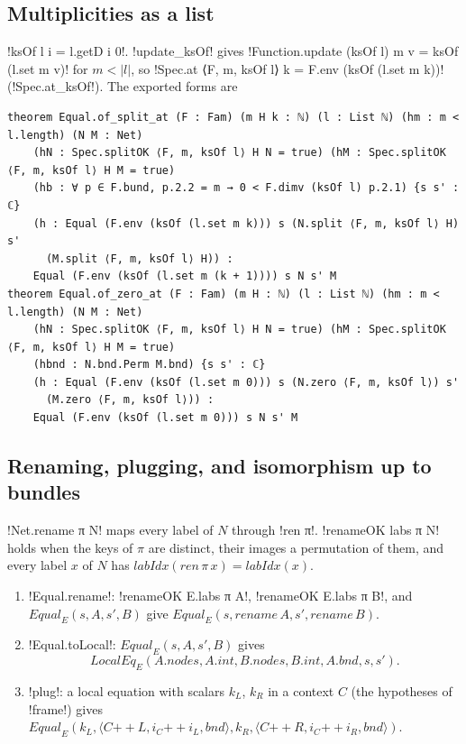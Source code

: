 {\subsection{Multiplicities as a list}
\lbx!ksOf l i = l.getD i 0!. \lbx!update_ksOf! gives \lbx!Function.update (ksOf l) m v = ksOf (l.set m v)! for $m<|l|$, so \lbx!Spec.at ⟨F, m, ksOf l⟩ k = F.env (ksOf (l.set m k))! (\lbx!Spec.at_ksOf!). The exported forms are
\begin{lstlisting}[style=leanbox]
theorem Equal.of_split_at (F : Fam) (m H k : ℕ) (l : List ℕ) (hm : m < l.length) (N M : Net)
    (hN : Spec.splitOK ⟨F, m, ksOf l⟩ H N = true) (hM : Spec.splitOK ⟨F, m, ksOf l⟩ H M = true)
    (hb : ∀ p ∈ F.bund, p.2.2 = m → 0 < F.dimv (ksOf l) p.2.1) {s s' : ℂ}
    (h : Equal (F.env (ksOf (l.set m k))) s (N.split ⟨F, m, ksOf l⟩ H) s'
      (M.split ⟨F, m, ksOf l⟩ H)) :
    Equal (F.env (ksOf (l.set m (k + 1)))) s N s' M
theorem Equal.of_zero_at (F : Fam) (m H : ℕ) (l : List ℕ) (hm : m < l.length) (N M : Net)
    (hN : Spec.splitOK ⟨F, m, ksOf l⟩ H N = true) (hM : Spec.splitOK ⟨F, m, ksOf l⟩ H M = true)
    (hbnd : N.bnd.Perm M.bnd) {s s' : ℂ}
    (h : Equal (F.env (ksOf (l.set m 0))) s (N.zero ⟨F, m, ksOf l⟩) s'
      (M.zero ⟨F, m, ksOf l⟩)) :
    Equal (F.env (ksOf (l.set m 0))) s N s' M
\end{lstlisting}

\subsection{Renaming, plugging, and isomorphism up to bundles}

\begin{definition}[Renaming]\label{def:boxes-rename}
\lbx!Net.rename π N! maps every label of $N$ through \lbx!ren π!. \lbx!renameOK labs π N! holds when the keys of $\pi$ are distinct, their images a permutation of them, and every label $x$ of $N$ has $\mathit{labIdx}(\mathit{ren}\,\pi\,x)=\mathit{labIdx}(x)$.
\end{definition}
\begin{proposition}\label{prop:boxes-rename-plug}
\begin{enumerate}
\item \lbx!Equal.rename!: \lbx!renameOK E.labs π A!, \lbx!renameOK E.labs π B!, and $\mathit{Equal}_E(s,A,s',B)$ give $\mathit{Equal}_E(s,\mathit{rename}\,A,s',\mathit{rename}\,B)$.
\item \lbx!Equal.toLocal!: $\mathit{Equal}_E(s,A,s',B)$ gives
\[\mathit{LocalEq}_E(A.\mathit{nodes},A.\mathit{int},B.\mathit{nodes},B.\mathit{int},A.\mathit{bnd},s,s').\]
\item \lbx!plug!: a local equation with scalars $k_L$, $k_R$ in a context $C$ (the hypotheses of \lbx!frame!) gives $\mathit{Equal}_E(k_L,\langle C\mathbin{+\!\!+}L,i_C\mathbin{+\!\!+}i_L,\mathit{bnd}\rangle,k_R,\langle C\mathbin{+\!\!+}R,i_C\mathbin{+\!\!+}i_R,\mathit{bnd}\rangle)$.
\end{enumerate}
\end{proposition}

}
